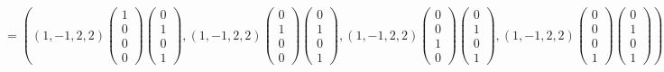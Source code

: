 \documentclass{article}
\begin{document}
$$= \left(\left(1, -1, 2, 2\right)\begin{pmatrix}1 \\ 0 \\ 0 \\ 0\end{pmatrix}\begin{pmatrix}0 \\ 1 \\ 0 \\ 1\end{pmatrix}, \left(1, -1, 2, 2\right)\begin{pmatrix}0 \\ 1 \\ 0 \\ 0\end{pmatrix}\begin{pmatrix}0 \\ 1 \\ 0 \\ 1\end{pmatrix}, \left(1, -1, 2, 2\right)\begin{pmatrix}0 \\ 0 \\ 1 \\ 0\end{pmatrix}\begin{pmatrix}0 \\ 1 \\ 0 \\ 1\end{pmatrix}, \left(1, -1, 2, 2\right)\begin{pmatrix}0 \\ 0 \\ 0 \\ 1\end{pmatrix}\begin{pmatrix}0 \\ 1 \\ 0 \\ 1\end{pmatrix}\right) =$$
\end{document}
